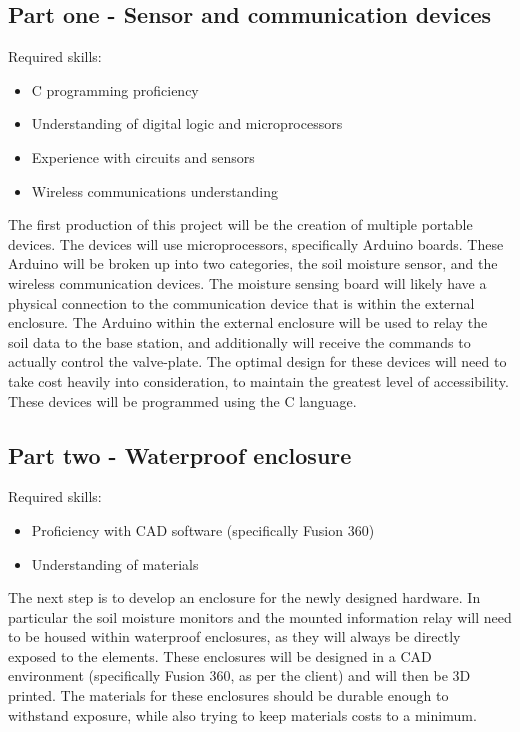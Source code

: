 \documentclass[onecolumn, draftclsnofoot,10pt, compsoc]{IEEEtran}
\begin{document}
	\subsection{Part one - Sensor and communication devices}
	Required skills:
	\begin{itemize}
		\item C programming proficiency
		\item Understanding of digital logic and microprocessors
		\item Experience with circuits and sensors
		\item Wireless communications understanding
	\end{itemize}
	The first production of this project will be the creation of multiple portable devices.
	The devices will use microprocessors, specifically Arduino boards.
	These Arduino will be broken up into two categories, the soil moisture sensor, and the wireless communication devices.
	The moisture sensing board will likely have a physical connection to the communication device that is within the external enclosure.
	The Arduino within the external enclosure will be used to relay the soil data to the base station, and additionally will receive the commands to actually control the valve-plate.
	The optimal design for these devices will need to take cost heavily into consideration, to maintain the greatest level of accessibility.
	These devices will be programmed using the C language.
	
	\subsection{Part two - Waterproof enclosure}
	Required skills:
	\begin{itemize}
		\item Proficiency with CAD software (specifically Fusion 360)
		\item Understanding of materials
	\end{itemize}
	
	The next step is to develop an enclosure for the newly designed hardware.
	In particular the soil moisture monitors and the mounted information relay will need to be housed within waterproof enclosures, as they will always be directly exposed to the elements.
	These enclosures will be designed in a CAD environment (specifically Fusion 360, as per the client) and will then be 3D printed.
	The materials for these enclosures should be durable enough to withstand exposure, while also trying to keep materials costs to a minimum.
	
\end{document}

